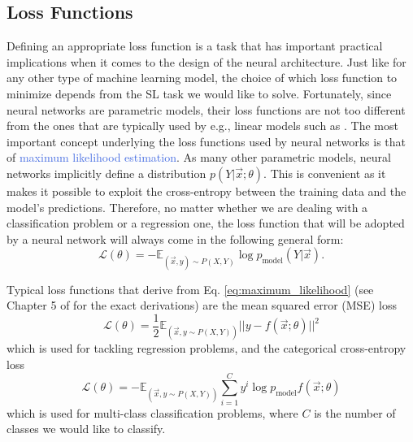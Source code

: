 \subsection{Loss Functions}
\label{sec:loss_functions}
Defining an appropriate loss function is a task that has important practical implications when it comes to the design of the neural architecture. Just like for any other type of machine learning model, the choice of which loss function to minimize depends from the SL task we would like to solve. Fortunately, since neural networks are parametric models, their loss functions are not too different from the ones that are typically used by e.g.,  linear models such as . The most important concept underlying the loss functions used by neural networks is that of \textcolor{RoyalBlue}{maximum likelihood estimation}. As many other parametric models, neural networks implicitly define a distribution $p(Y|\vec{x};\theta)$. This is convenient as it makes it possible to exploit the cross-entropy between the training data and the model's predictions. Therefore, no matter whether we are dealing with a classification problem or a regression one, the loss function that will be adopted by a neural network will always come in the following general form:
\begin{equation}
	\mathscr{L}(\theta) = - \mathds{E}_{(\vec{x},y)\sim P(X,Y)} \log p_\text{model} (Y|\vec{x}).
	\label{eq:maximum_likelihood}
\end{equation}

Typical loss functions that derive from Eq. \ref{eq:maximum_likelihood} (see Chapter 5 of \cite{goodfellow2016deep} for the exact derivations) are the mean squared error (MSE) loss
\begin{equation}
	\mathscr{L}(\theta) = \frac{1}{2}\mathds{E}_{(\vec{x},y\sim P(X,Y))} ||y - f(\vec{x};\theta) ||^{2}
	\label{eq:mean_squared_error}
\end{equation}
which is used for tackling regression problems, and the categorical cross-entropy loss
\begin{equation}
	\mathscr{L}(\theta) = - \mathds{E}_{(\vec{x},y\sim P(X,Y))} \sum_{i=1}^{C} y^{i} \log p_\text{model} f(\vec{x};\theta)
	\label{eq:cross_entropy}
\end{equation}
which is used for multi-class classification problems, where $C$ is the number of classes we would like to classify. 

